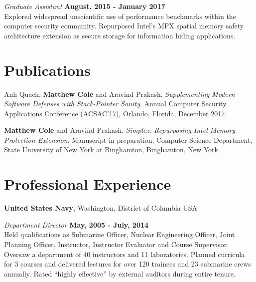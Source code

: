 \documentclass[margin,line]{res}
\begin{document}
\begin{resume}
\vspace{-.1cm}
{\em Graduate Assistant} \hfill {\bf August, 2015 - January 2017}\\
Explored widespread unscientific use of performance benchmarks within the computer security community. Repurposed Intel's MPX spatial memory safety architecture extension as secure storage for information hiding applications.

\section{\sc Publications}

Anh Quach, \textbf{Matthew Cole} and Aravind Prakash. \textit{Supplementing Modern Software Defenses with Stack-Pointer Sanity}.
Annual Computer Security Applications Conference (ACSAC'17), Orlando, Florida, December 2017.

\textbf{Matthew Cole} and Aravind Prakash. \textit{Simplex: Repurposing Intel Memory Protection Extension}.
Manuscript in preparation, Computer Science Department, State University of New York at Binghamton, Binghamton, New York.




\section{\sc Professional Experience}

{\bf United States Navy}, Washington, District of Columbia USA

\vspace{-.3cm}
{\em Department Director} \hfill {\bf May, 2005 - July, 2014}\\
Held qualifications as Submarine Officer, Nuclear Engineering Officer, Joint Planning Officer, Instructor, Instructor Evaluator and Course Supervisor. Oversaw a department of 40 instructors and 11 laboratories. Planned curricula for 3 courses and delivered lectures for over 120 trainees and 23 submarine crews annually. Rated ``highly effective'' by external auditors during entire tenure.


\end{resume}
\end{document}
